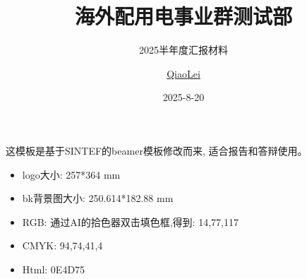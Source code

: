 \documentclass{beamer}
\title{海外配用电事业群测试部}
\subtitle{2025半年度汇报材料}
\author{\href{mailto:qiaolei@hxgroup.com}{QiaoLei}}
\date{2025-8-20}
\begin{document}
\maketitle


\begin{frame}

这模板是基于SINTEF的beamer模板修改而来, 适合报告和答辩使用。

\vspace{\baselineskip}

\begin{itemize}
    \item logo大小: 257*364 mm
    \item bk背景图大小: 250.614*182.88 mm
    \item RGB: 通过AI的拾色器双击填色框,得到: 14,77,117
    \item CMYK: 94,74,41,4
    \item Html: 0E4D75
\end{itemize}

\vspace{\baselineskip}

\end{frame}







\backmatter
\end{document}
